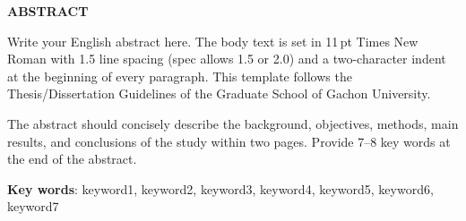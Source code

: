 \clearpage
\thispagestyle{plain}

\begin{center}
{\fontsize{16pt}{22pt}\selectfont\bfseries ABSTRACT\par}

\vspace{6mm}

{\fontsize{14pt}{20pt}\selectfont\bfseries\itshape \ThesisTitleEN\par}
\end{center}

\vspace{6mm}

\begin{flushright}
{\fontsize{12pt}{18pt}\selectfont
\AuthorEN\par
\DepartmentEN\par
\GraduateSchoolEN\par}
\end{flushright}

\vspace{8mm}


Write your English abstract here. The body text is set in 11\,pt Times New Roman
with 1.5 line spacing (spec allows 1.5 or 2.0) and a two-character indent at
the beginning of every paragraph. This template follows the Thesis/Dissertation
Guidelines of the Graduate School of Gachon University.

The abstract should concisely describe the background, objectives, methods,
main results, and conclusions of the study within two pages. Provide 7--8 key
words at the end of the abstract.

\vfill

\noindent\textbf{Key words}: keyword1, keyword2, keyword3, keyword4, keyword5, keyword6, keyword7

\clearpage
